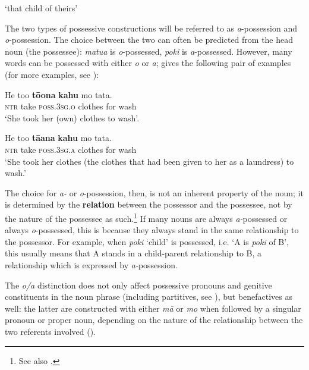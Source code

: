 \glt
‘that child of theirs’\textstyleExampleref{} 
\z

The two types of possessive constructions will be referred to as \textit{a}{}-possession and \textit{o}{}-possession. The choice between the two can often be predicted from the head noun (the possessee): \textit{matu{\ꞌ}a} is \textit{o}{}-possessed, \textit{poki} is \textit{a}{}-possessed. However, many words can be possessed with either \textit{o} or \textit{{\ꞌ}a}; \citet[43]{Englert1978} gives the following pair of examples (for more examples, see ):

\ea\label{ex:6.58}
\gll He to{\ꞌ}o \textbf{tō{\ꞌ}ona} \textbf{kahu} mo tata. \\
\textsc{ntr} take \textsc{poss.3sg.o} clothes for wash \\

\glt 
‘She took her (own) clothes to wash’.\textstyleExampleref{} 
\z

\ea\label{ex:6.59}
\gll He to{\ꞌ}o \textbf{tā{\ꞌ}ana} \textbf{kahu} mo tata. \\
\textsc{ntr} take \textsc{poss.3sg.a} clothes for wash \\

\glt
‘She took her clothes (the clothes that had been given to her as a laundress) to wash.’\textstyleExampleref{} 
\z

The choice for \textit{{\ꞌ}a-} or \textit{o}{}-possession, then, is not an inherent property of the noun; it is determined by the \textbf{relation} between the possessor and the possessee, not by the nature of the possessee as such.\footnote{\label{fn:296}See also \citet[151]{Chapin1978}.} If many nouns are always \textit{a-}possessed or always \textit{o}{}-possessed, this is because they always stand in the same relationship to the possessor. For example, when \textit{poki} ‘child’ is possessed, i.e. ‘A is \textit{poki} of B’, this usually means that A stands in a child-parent relationship to B, a relationship which is expressed by \textit{a-}possession.

The \textit{o/a} distinction does not only affect possessive pronouns and genitive constituents in the noun phrase (including partitives, see ), but benefactives as well: the latter are constructed with either \textit{mā} or \textit{mo} when followed by a singular pronoun or proper noun, depending on the nature of the relationship between the two referents involved ().

